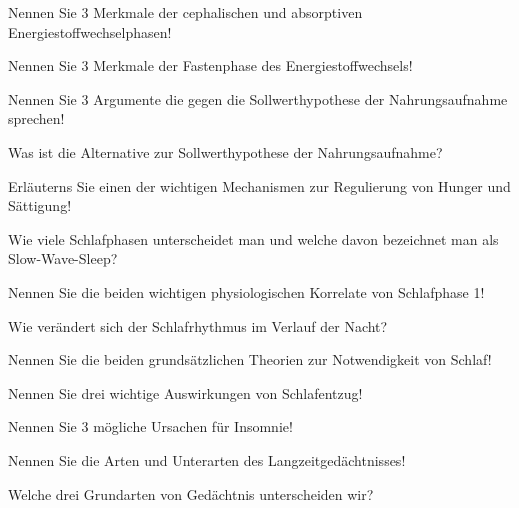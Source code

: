 \documentclass[10pt, a4paper]{exam}
\begin{document}
\begin{questions}
  \begin{solution}
  \end{solution}
  \question Nennen Sie 3 Merkmale der cephalischen und absorptiven Energiestoffwechselphasen!
  \begin{solution}
  \end{solution}
  \question Nennen Sie 3 Merkmale der Fastenphase des Energiestoffwechsels!
  \begin{solution}
  \end{solution}
  \question Nennen Sie 3 Argumente die gegen die Sollwerthypothese der Nahrungsaufnahme sprechen!
  \begin{solution}
  \end{solution}
  \question Was ist die Alternative zur Sollwerthypothese der Nahrungsaufnahme?
  \begin{solution}
  \end{solution}
  \question Erläuterns Sie einen der wichtigen Mechanismen zur Regulierung von Hunger und Sättigung!
  \begin{solution}
  \end{solution}
  \question Wie viele Schlafphasen unterscheidet man und welche davon bezeichnet man als Slow-Wave-Sleep?
  \begin{solution}
  \end{solution}
  \question Nennen Sie die beiden wichtigen physiologischen Korrelate von Schlafphase 1!
  \begin{solution}
  \end{solution}
  \question Wie verändert sich der Schlafrhythmus im Verlauf der Nacht?
  \begin{solution}
  \end{solution}
  \question Nennen Sie die beiden grundsätzlichen Theorien zur Notwendigkeit von Schlaf!
  \begin{solution}
  \end{solution}
  \question Nennen Sie drei wichtige Auswirkungen von Schlafentzug!
  \begin{solution}
  \end{solution}
  \question Nennen Sie 3 mögliche Ursachen für Insomnie!
  \begin{solution}
  \end{solution}
  \question Nennen Sie die Arten und Unterarten des Langzeitgedächtnisses!
  \begin{solution}
  \end{solution}
  \question Welche drei Grundarten von Gedächtnis unterscheiden wir?
  \begin{solution}

\end{solution}
\end{questions}
\end{document}
